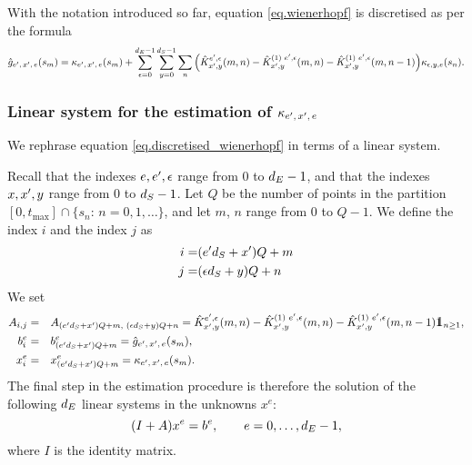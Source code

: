 \documentclass[10pt, article,table]{article}
\begin{document}
\begin{prop}\label{prop.discretised_wienerhopf}
 With the notation introduced so far,  equation \eqref{eq.wienerhopf} is discretised as per the formula
 \begin{equation}\label{eq.discretised_wienerhopf}
 \hat{g}_{e^{\prime},\, x^{\prime},\, e} (s_m)
 =
 \kappa_{e^{\prime},\, x^{\prime},\, e} (s_m)
 +\sum_{\epsilon = 0}^{d_{E} -1}\sum_{y=0}^{d_{S}-1}
 \sum_{n}
 \Big(
 \hat{K}_{x^{\prime},y}^{e^{\prime},\epsilon}(m,n)
 -\hat{K}_{x^{\prime},y}^{(1) \, \, e^{\prime},\epsilon}(m,n)
 -\hat{K}_{x^{\prime},y}^{(1) \, \, e^{\prime},\epsilon}(m,n-1)
 \Big)
 \kappa_{\epsilon, y, e}(s_n).
 \end{equation}
\end{prop}

\subsubsection{Linear system for the estimation of $\kappa_{e^{\prime},\, x^{\prime},\, e}$}
We rephrase equation \eqref{eq.discretised_wienerhopf} in terms of a linear system.

Recall that the indexes $e, e^{\prime}, \epsilon$ range from $0$ to $d_{E} -1$, and that the indexes $x,x^{\prime}, y$ range from $0$ to $d_{S} -1$.  Let $Q$ be the number of points in the partition $[0,t_{\text{max}}] \cap \lbrace s_n: \, n=0,1,\dots\rbrace$, and let $m$, $n$ range from $0$ to $Q-1$. 
We define the index $i$ and the index $j$ as
\begin{equation*}
 \begin{split}
  i =& (e^{\prime} d_{S} + x^{\prime})Q +m\\
  j =& (\epsilon d_{S} + y)Q +n
 \end{split}
\end{equation*}
We set 
\begin{equation*}
 \begin{split}
  A_{i,j} = & \quad 
  A_{(\eone \numStates + \xone)Q +m, \, \, (\epsilon \numStates + y)Q +n}
  = \hat{\WHconvkernel}_{\xone,y}^{\eone,\epsilon}(m,n)
 -\hat{\WHconvkernel}_{\xone,y}^{(1) \, \, \eone,\epsilon}(m,n)
 -\hat{\WHconvkernel}_{\xone,y}^{(1) \, \, \eone,\epsilon}(m,n-1)\one_{n\geq 1},
 \\
 b^{e}_{i} = & \quad 
 b^{e}_{(\eone \numStates + \xone)Q +m}
 =
 \hat{g}\subscriptexe (s_m),
 \\
 x^{e}_{i} = & \quad 
 x^{e}_{(\eone \numStates + \xone)Q +m}
 =
 \hawkesKernel\subscriptexe(s_m).
 \end{split}
\end{equation*}
The final step in the estimation procedure is therefore the solution of the following $d_{E}$ linear systems in the unknowns $x^{e}$:
\begin{equation*}
 (I + A) x^{e} = b^{e}, \qquad e=0,\dots, d_{E}-1,
\end{equation*}
where $I$ is the identity matrix.
\end{document}
